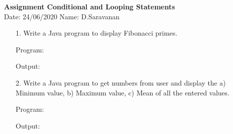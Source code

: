 \documentclass[a4paper,11pt,openright]{report}
\begin{document}
\singlespacing
\pagestyle{plain}

\begin{center}
\textbf{Assignment Conditional and Looping Statements} \\
Date: 24/06/2020 \hspace{2mm} Name: D.Saravanan
\end{center}

\vspace{10px}

\begin{enumerate}

\item[1.] Write a Java program to display Fibonacci primes.

Program:

Output:


\pagebreak

\item[2.] Write a Java program to get  numbers from user and display the a) Minimum
value, b) Maximum value, c) Mean of all the entered values.

Program:


\vspace{0.5cm}

Output:


\end{enumerate}
\end{document}
